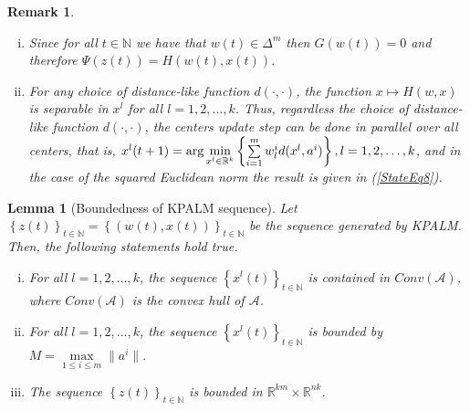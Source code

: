 \documentclass[11pt]{article}
\numberwithin{equation}{section}
\newtheorem{lemma}{Lemma}[proposition]
\newtheorem{remark}{Remark}
\begin{document}
\begin{remark} 
	\begin{enumerate}[(i)] \label{StateEq15}
		\item Since for all $t \in \mathbb{N}$ we have that $w(t) \in \Delta^m$ then $G(w(t))=0$ and therefore $\Psi(z(t)) = H(w(t),x(t))$. \label{StateEq16}
		\item For any choice of distance-like function $d(\cdot, \cdot)$, the function $x \mapsto H(w,x)$ is separable in $x^l$ for all $l = 1, 2, \ldots, k$. Thus, regardless the choice of distance-like function $d(\cdot, \cdot)$, the centers update step can be done in parallel over all centers, that is, $x^l(t+1) = \arg\min\limits_{x^l \in \mathbb{R}^k} \left\lbrace \sum\limits_{i=1}^{m} w^i_l d(x^l , a^i) \right\rbrace, \\ l = 1, 2, \ldots, k$, and in the case of the squared Euclidean norm the result is given in (\ref{StateEq8}).
	\end{enumerate}
\end{remark}

\begin{lemma}[Boundedness of KPALM sequence]
Let $\left\lbrace z(t) \right\rbrace_{t \in \mathbb{N}} = \left\lbrace (w(t) , x(t)) \right\rbrace_{t \in \mathbb{N}}$ be the sequence generated by KPALM. Then, the following statements hold true.
\begin{enumerate}[(i)]
	\item For all $l=1, 2, \ldots ,k$, the sequence $\left\lbrace x^l(t) \right\rbrace_{t \in \mathbb{N}}$ is contained in $Conv(\mathcal{A})$, where $Conv(\mathcal{A})$ is the convex hull of $\mathcal{A}$.
	\item For all $l=1, 2, \ldots ,k$, the sequence $\left\lbrace x^l(t) \right\rbrace_{t \in \mathbb{N}}$ is bounded by $M = \max\limits_{1 \leq i \leq m} \| a^i \|$.
	\item The sequence $\left\lbrace z(t) \right\rbrace_{t \in \mathbb{N}}$ is bounded in $\mathbb{R}^{km} \times \mathbb{R}^{nk}$.
\end{enumerate}
\end{lemma}
\end{document}
